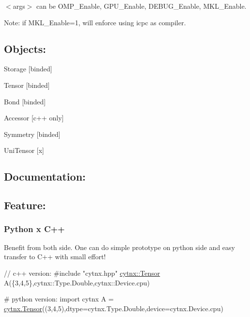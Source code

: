 $<$args$>$ can be O\+M\+P\+\_\+\+Enable, G\+P\+U\+\_\+\+Enable, D\+E\+B\+U\+G\+\_\+\+Enable, M\+K\+L\+\_\+\+Enable.

Note\+: if M\+K\+L\+\_\+\+Enable=1, will enforce using icpc as compiler.

\subsection*{Objects\+:}


\begin{DoxyItemize}
\item Storage \mbox{[}binded\mbox{]}
\item Tensor \mbox{[}binded\mbox{]}
\item Bond \mbox{[}binded\mbox{]}
\item Accessor \mbox{[}c++ only\mbox{]}
\item Symmetry \mbox{[}binded\mbox{]}
\item Uni\+Tensor \mbox{[}x\mbox{]}
\end{DoxyItemize}

\subsection*{Documentation\+:}

\subsection*{Feature\+:}

\subsubsection*{Python x C++}

Benefit from both side. One can do simple prototype on python side and easy transfer to C++ with small effort!


\begin{DoxyCode}
\textcolor{comment}{// c++ version:}
\textcolor{preprocessor}{#include "cytnx.hpp"}
\hyperlink{classcytnx_1_1Tensor}{cytnx::Tensor} A(\{3,4,5\},cytnx::Type.Double,cytnx::Device.cpu)
\end{DoxyCode}



\begin{DoxyCode}
\textcolor{comment}{# python version:}
\textcolor{keyword}{import} cytnx
A =  \hyperlink{classcytnx_1_1Tensor}{cytnx.Tensor}((3,4,5),dtype=cytnx.Type.Double,device=cytnx.Device.cpu)
\end{DoxyCode}


